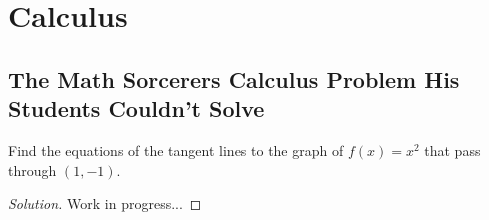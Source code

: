 \documentclass[11pt]{article}
\begin{document}
\section{Calculus}
\subsection{The Math Sorcerers Calculus Problem His Students Couldn't Solve}
Find the equations of the tangent lines to the graph of $f(x) = x^2$ that pass through $(1,-1)$.
\renewcommand\qedsymbol{$\diagup\!\!\!\diagup$}
\begin{proof}[Solution]
Work in progress...
\end{proof}
\renewcommand\qedsymbol{$square$}
\end{document}
